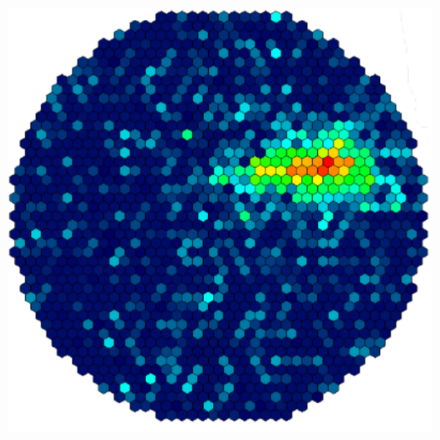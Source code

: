 \documentclass[aspectratio=1610, professionalfonts, 9pt]{beamer}
\begin{document}
\begin{frame}
\begin{columns}
\begin{figure}
	  \includegraphics[height=0.8\textheight]{./images/Hadron.pdf}
	  \caption{\cite{FACT}}
	\end{figure}
  \end{columns}
\end{frame}
\end{document}
